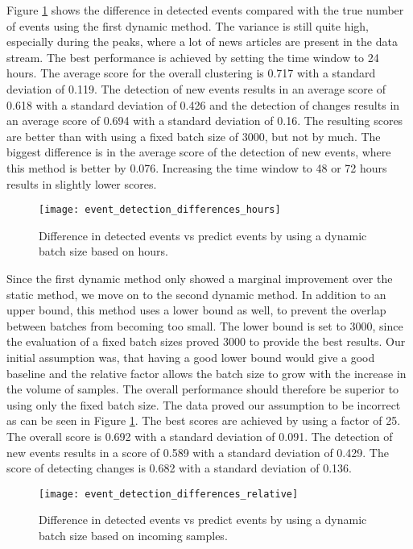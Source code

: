 Figure \ref{fig:event_detection_differences_hours} shows the difference in detected events compared with the true number of events using the first dynamic method. The variance is still quite high, especially during the peaks, where a lot of news articles are present in the data stream. The best performance is achieved by setting the time window to 24 hours. The average score for the overall clustering is 0.717 with a standard deviation of 0.119. The detection of new events results in an average score of 0.618 with a standard deviation of 0.426 and the detection of changes results in an average score of 0.694 with a standard deviation of 0.16. The resulting scores are better than with using a fixed batch size of 3000, but not by much. The biggest difference is in the average score of the detection of new events, where this method is better by 0.076. Increasing the time window to 48 or 72 hours results in slightly lower scores.

\begin{figure}[h]
    \centering
    \texttt{[image: event\_detection\_differences\_hours]}
    \caption{Difference in detected events vs predict events by using a dynamic batch size based on hours.}
    \label{fig:event_detection_differences_hours}
\end{figure}

Since the first dynamic method only showed a marginal improvement over the static method, we move on to the second dynamic method. In addition to an upper bound, this method uses a lower bound as well, to prevent the overlap between batches from becoming too small. The lower bound  is set to 3000, since the evaluation of a fixed batch sizes proved 3000 to provide the best results. Our initial assumption was, that having a good lower bound would give a good baseline and the relative factor allows the batch size to grow with the increase in the volume of samples. The overall performance should therefore be superior to using only the fixed batch size. The data proved our assumption to be incorrect as can be seen in Figure \ref{fig:event_detection_differences_hours}. The best scores are achieved by using a factor of 25. The overall score is 0.692 with a standard deviation of 0.091. The detection of new events results in a score of 0.589 with a standard deviation of 0.429. The score of detecting changes is 0.682 with a standard deviation of 0.136.

\begin{figure}[h]
   \centering
   \texttt{[image: event\_detection\_differences\_relative]}
   \caption{Difference in detected events vs predict events by using a dynamic batch size based on incoming samples.}
   \label{fig:event_detection_differences_relative}
\end{figure}

